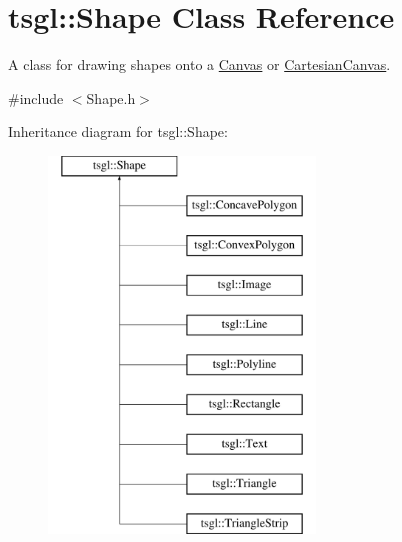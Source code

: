 \hypertarget{classtsgl_1_1_shape}{\section{tsgl\-:\-:\-Shape \-Class \-Reference}
\label{classtsgl_1_1_shape}
}


\-A class for drawing shapes onto a \hyperlink{classtsgl_1_1_canvas}{\-Canvas} or \hyperlink{classtsgl_1_1_cartesian_canvas}{\-Cartesian\-Canvas}.  




{\ttfamily \#include $<$\-Shape.\-h$>$}

\-Inheritance diagram for tsgl\-:\-:\-Shape\-:\begin{figure}[H]
\begin{center}
\leavevmode
\includegraphics[height=10.000000cm]{classtsgl_1_1_shape}
\end{center}
\end{figure}
